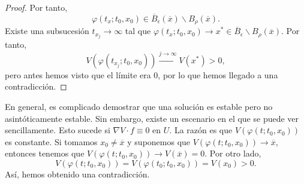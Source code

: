 \begin{proof}
Por tanto, 
\[\varphi\left(t_{x}; t_{0}, x_{0}\right)\in \overline{B}_{\epsilon }\left(\overline{x}\right)\backslash B_{\rho }\left(\overline{x}\right) .\]
Existe una subsucesión $\displaystyle t_{x_{j}}\to \infty $ tal que $\displaystyle \varphi\left(t_{x}; t_{0}, x_{0}\right) \to x^{*}\in \overline{B}_{\epsilon }\backslash B_{\rho }\left(\overline{x}\right) $. Por tanto, 
\[V\left(\varphi\left(t_{x_{j}}; t_{0}, x_{0}\right)\right)\xrightarrow{j \to \infty} V\left(x^{*}\right) > 0 ,\]
pero antes hemos visto que el límite era 0, por lo que hemos llegado a una contradicción. 
\end{proof}
\begin{observation}
En general, es complicado demostrar que una solución es estable pero no asintóticamente estable. Sin embargo, existe un escenario en el que se puede ver sencillamente. Esto sucede si $\displaystyle \nabla V \cdot f \equiv 0 $ en $\displaystyle U $. La razón es que $\displaystyle V\left(\varphi\left(t; t_{0}, x_{0}\right)\right) $ es constante. Si tomamos $\displaystyle x_{0} \neq \overline{x} $ y suponemos que $\displaystyle V\left(\varphi\left(t; t_{0}, x_{0}\right)\right)\to \overline{x} $, entonces tenemos que $\displaystyle V\left(\varphi\left(t; t_{0}, x_{0}\right)\right)\to V\left(\overline{x}\right) = 0 $. 
Por otro lado, 
\[V\left(\varphi\left(t; t_{0}, x_{0}\right)\right)= V\left(\varphi\left(t_{0}; t_{0}, x_{0}\right)\right) = V\left(x_{0}\right) > 0 .\]
Así, hemos obtenido una contradicción.
\end{observation}

